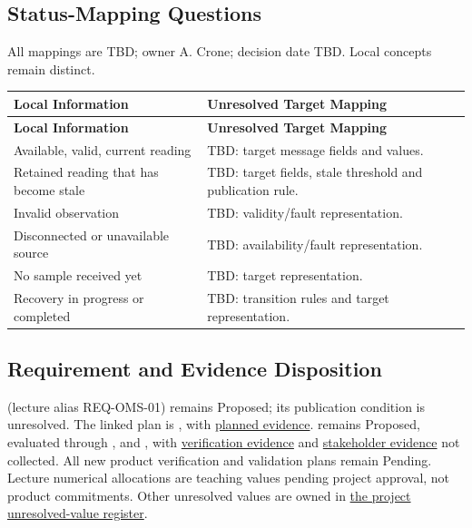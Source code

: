 \subsection{Status-Mapping Questions}
All mappings are TBD; owner A. Crone; decision date TBD. Local concepts remain distinct.

\begin{tabularx}{\linewidth}{L{5.3cm}Y}
\caption{Pending OMS Status Mapping\label{Table:OMSStatusMapping}}\\
\toprule\textbf{Local Information} & \textbf{Unresolved Target Mapping}\\\midrule\endfirsthead
\toprule\textbf{Local Information} & \textbf{Unresolved Target Mapping}\\\midrule\endhead\bottomrule\endlastfoot
Available, valid, current reading & TBD: target message fields and values.\\
Retained reading that has become stale & TBD: target fields, stale threshold and publication rule.\\
Invalid observation & TBD: validity/fault representation.\\
Disconnected or unavailable source & TBD: availability/fault representation.\\
No sample received yet & TBD: target representation.\\
Recovery in progress or completed & TBD: transition rules and target representation.\\
\end{tabularx}
\subsection{Requirement and Evidence Disposition}
 (lecture alias REQ-OMS-01) remains Proposed;
its publication condition is unresolved. The linked plan is
, with \hyperref[PlannedEvidence:VER-019]{planned evidence}.
 remains Proposed, evaluated through
,  and ,
with \hyperref[PlannedEvidence:VER-027]{verification evidence} and
\hyperref[PlannedEvidence:VAL-008]{stakeholder evidence} not collected.
All new product verification and validation plans remain Pending.
Lecture numerical allocations are teaching values pending project approval,
not product commitments. Other unresolved values are owned in
\hyperref[Table:ProjectUnresolvedValues]{the project unresolved-value register}.
